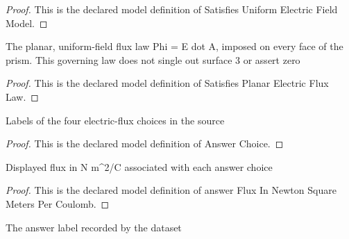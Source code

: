 \begin{proof}
  This is the declared model definition of Satisfies Uniform Electric Field Model.
\end{proof}
\begin{definition}
  \label{def:physics:phyx-mini-0851:phyxminiproblems-problemphyxmini0851-satisfiesplanarelectricfluxlaw}
  The planar, uniform-field flux law Phi = E dot A, imposed on every face of the prism. This governing law does not single out surface 3 or assert zero
\end{definition}
\begin{proof}
  This is the declared model definition of Satisfies Planar Electric Flux Law.
\end{proof}
\begin{definition}
  \label{def:physics:phyx-mini-0851:phyxminiproblems-problemphyxmini0851-answerchoice}
  Labels of the four electric-flux choices in the source
\end{definition}
\begin{proof}
  This is the declared model definition of Answer Choice.
\end{proof}
\begin{definition}
  \label{def:physics:phyx-mini-0851:phyxminiproblems-problemphyxmini0851-answerfluxinnewtonsquaremeterspercoulomb}
  Displayed flux in N m\textasciicircum{}2/C associated with each answer choice
\end{definition}
\begin{proof}
  This is the declared model definition of answer Flux In Newton Square Meters Per Coulomb.
\end{proof}
\begin{definition}
  \label{def:physics:phyx-mini-0851:phyxminiproblems-problemphyxmini0851-recordeddatasetanswer}
  The answer label recorded by the dataset
\end{definition}
